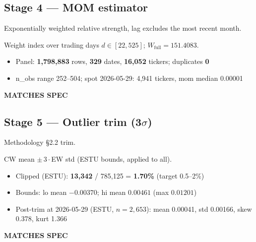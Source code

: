 \documentclass[11pt,a4paper]{article}
\newcommand{\PASS}[1]{\textcolor{pass}{\textbf{#1}}}
\begin{document}
\subsection{Stage 4 --- MOM estimator}

\begin{description}[style=nextline]
  \item[PDF SPEC] Exponentially weighted relative strength, lag excludes the most recent month.
  \item[Implementation] Weight index over trading days $d \in [22, 525]$; $W_{\text{full}} = 151.4083$.
  \item[Observed]\phantom{x}
    \begin{itemize}[nosep, topsep=-\parskip]
      \item Panel: \textbf{1{,}798{,}883} rows, \textbf{329} dates, \textbf{16{,}052} tickers; duplicates \textbf{0}
      \item n\_obs range 252--504; spot 2026-05-29: 4{,}941 tickers, mom median 0.00001
    \end{itemize}
  \item[Status] \PASS{MATCHES SPEC}
\end{description}

\subsection{Stage 5 --- Outlier trim (3$\sigma$)}

\begin{description}[style=nextline]
  \item[PDF SPEC] Methodology \S2.2 trim.
  \item[Implementation] CW mean $\pm\,3\cdot$EW std (ESTU bounds, applied to all).
  \item[Observed]\phantom{x}
    \begin{itemize}[nosep, topsep=-\parskip]
      \item Clipped (ESTU): \textbf{13{,}342} / 785{,}125 = \textbf{1.70\%} (target 0.5--2\%)
      \item Bounds: lo mean $-0.00370$; hi mean $0.00461$ (max $0.01201$)
      \item Post-trim at 2026-05-29 (ESTU, $n=2{,}653$): mean 0.00041, std 0.00166, skew 0.378, kurt 1.366
    \end{itemize}
  \item[Status] \PASS{MATCHES SPEC}
\end{description}
\end{document}

